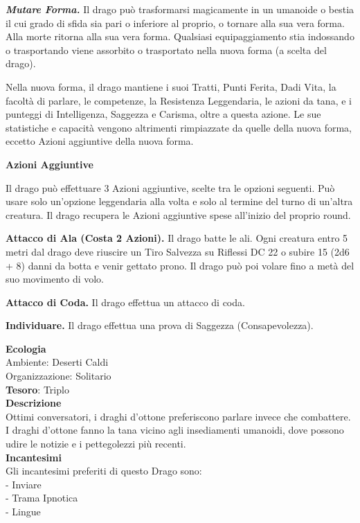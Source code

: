 \begin{multicols}{2}
	\textit{\textbf{Mutare Forma.}} Il drago può trasformarsi magicamente in un umanoide o bestia il cui grado di sfida sia pari o inferiore al proprio, o tornare alla sua vera forma. Alla morte ritorna alla sua vera forma. Qualsiasi equipaggiamento stia indossando o trasportando viene assorbito o trasportato nella nuova forma (a scelta del drago).

	Nella nuova forma, il drago mantiene i suoi Tratti, Punti Ferita, Dadi Vita, la facoltà di parlare, le competenze, la Resistenza Leggendaria, le azioni da tana, e i punteggi di Intelligenza, Saggezza e Carisma, oltre a questa azione. Le sue statistiche e capacità vengono altrimenti rimpiazzate da quelle della nuova forma, eccetto Azioni aggiuntive della nuova forma.

	\textbf{Azioni Aggiuntive}

	Il drago può effettuare 3 Azioni aggiuntive, scelte tra le opzioni seguenti. Può usare solo un'opzione leggendaria alla volta e solo al termine del turno di un'altra creatura. Il drago recupera le Azioni aggiuntive spese all'inizio del proprio round.

	\textbf{Attacco di Ala (Costa 2 Azioni).} Il drago batte le ali. Ogni creatura entro 5 metri dal drago deve riuscire un Tiro Salvezza su Riflessi DC 22 o subire 15 (2d6 + 8) danni da botta e venir gettato prono. Il drago può poi volare fino a metà del suo movimento di volo.

	\textbf{Attacco di Coda.} Il drago effettua un attacco di coda.

	\textbf{Individuare.} Il drago effettua una prova di Saggezza (Consapevolezza).

	\textbf{Ecologia}\\
	Ambiente: Deserti Caldi\\
	Organizzazione: Solitario\\
	\textbf{Tesoro}: Triplo\\
	\textbf{Descrizione}\\
	Ottimi conversatori, i draghi d'ottone preferiscono parlare invece che combattere. I draghi d'ottone fanno la tana vicino agli insediamenti umanoidi, dove possono udire le notizie e i pettegolezzi più recenti.\\
	\textbf{Incantesimi}\\
	Gli incantesimi preferiti di questo Drago sono:\\
	- Inviare\\
	- Trama Ipnotica\\
	- Lingue



\end{multicols}
